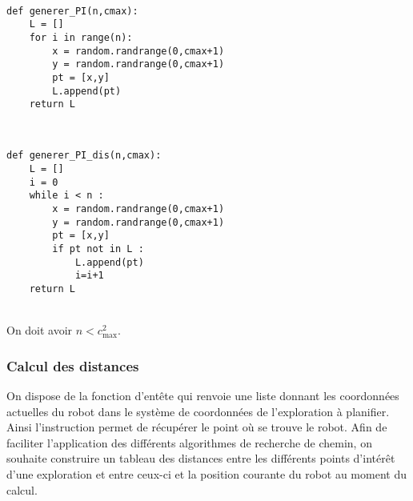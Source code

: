 \ifprof
\begin{corrige}~\\ \vspace{-.7cm}
\begin{lstlisting}
def generer_PI(n,cmax):
    L = []
    for i in range(n):
        x = random.randrange(0,cmax+1)
        y = random.randrange(0,cmax+1)
        pt = [x,y]
        L.append(pt)
    return L
\end{lstlisting}
\end{corrige}
\else
\fi

\ifprof
\begin{corrige}~\\ \vspace{-.7cm}
\begin{lstlisting}
def generer_PI_dis(n,cmax):
    L = []
    i = 0
    while i < n :
        x = random.randrange(0,cmax+1)
        y = random.randrange(0,cmax+1)
        pt = [x,y]
        if pt not in L : 
            L.append(pt)
            i=i+1
    return L
\end{lstlisting}
\end{corrige}
\else
\fi

\ifprof
\begin{corrige}~\\
On doit avoir $n<c_{\text{max}}^2$.
\end{corrige}
\else
\fi


\subsubsection{Calcul des distances}
\ifprof
\else
On dispose de la fonction d’entête  qui renvoie une liste donnant les coordonnées actuelles du robot dans le système de coordonnées de l’exploration
à planifier. Ainsi l’instruction  permet de récupérer le point où se trouve le robot.
Afin de faciliter l’application des différents algorithmes de recherche de chemin, on souhaite construire un tableau
des distances entre les différents points d’intérêt d’une exploration et entre ceux-ci et la position courante du
robot au moment du calcul.
\fi

